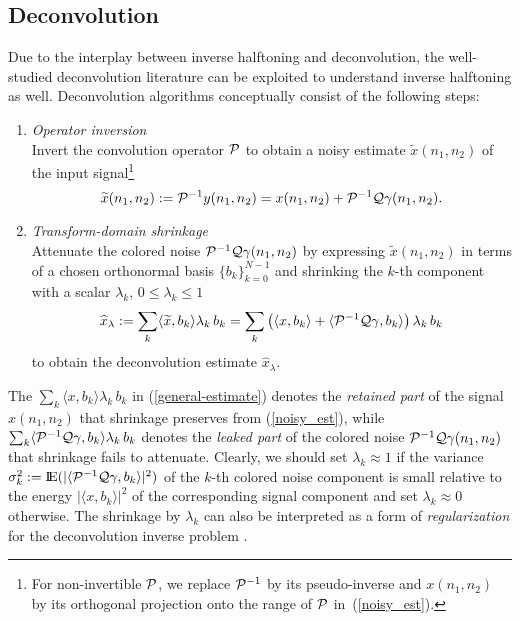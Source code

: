 \documentclass[11pt]{article}
\def\nnnx {n_1}
\def\nnny {n_2}
\def\NSQ{N}
\newcommand{\expect}{{\rm I \mkern-2.5mu \nonscript\mkern-.5mu E}}
\def\cP { {\cal{P}} }
\def\cQ { {\cal{Q}} }
\begin{document}
\subsection{Deconvolution}
\label{deconvolution}
\sloppy Due to the interplay between inverse halftoning and
deconvolution, the well-studied deconvolution literature
\cite{akjain,katman-book,Neelamani1} can be exploited to understand
inverse halftoning as well.  Deconvolution algorithms conceptually
consist of the following steps:
\begin{enumerate}
\item {\em Operator inversion}\\
Invert the convolution operator $\cP$ to obtain a noisy
estimate $\widetilde{x}(\nnnx,\nnny)$ of the input signal\footnote{For
non-invertible $\cP$, we replace $\cP^{-1}$ by its pseudo-inverse and
$x(\nnnx,\nnny)$ by its orthogonal projection onto the range of $\cP$
in~(\ref{noisy_est}).} 
\begin{equation}\widetilde{x}(\nnnx,\nnny) :=
\cP^{-1}y(\nnnx,\nnny) = x(\nnnx,\nnny) + \cP^{-1}\cQ\gamma(\nnnx,\nnny).
\label{noisy_est}
\end{equation}
\item {\em Transform-domain shrinkage}\\ 
Attenuate the colored noise
$\cP^{-1}\cQ\gamma(\nnnx,\nnny)$ by expressing $\widetilde{x}(\nnnx,\nnny)$ in
terms of a chosen  orthonormal basis
$\{b_k\}_{k=0}^{\NSQ -1}$  and shrinking the $k$-th component with a scalar
$\lambda_k$, $ 0\le \lambda_k \le 1$ \cite{james-stein}
\begin{equation} 
\widehat{x}_{\lambda} := \sum_k \langle \widetilde{x},b_k\rangle \lambda_k\, b_k = \sum_k \left(\langle x,b_k\rangle + \langle
\cP^{-1}\cQ\gamma,b_k\rangle\right) \lambda_k\, b_k 
\label{general-estimate}
\end{equation}
to obtain the deconvolution estimate $\widehat{x}_{\lambda}$.
\end{enumerate}

The $\sum_k \langle x,b_k\rangle \lambda_k\, b_k$ in
(\ref{general-estimate}) denotes the {\em retained part} of the signal
$x(\nnnx,\nnny)$ that shrinkage preserves from (\ref{noisy_est}),
while $\sum_k \langle \cP^{-1}\cQ\gamma,b_k\rangle \lambda_k\, b_k$
denotes the {\em leaked part} of the colored noise
$\cP^{-1}\cQ\gamma(\nnnx,\nnny)$ that shrinkage fails to attenuate.
Clearly, we should set $\lambda_k \approx 1$ if the variance
$\sigma_k^2 := \expect(|\langle \cP^{-1}\cQ\gamma,b_k\rangle|^2)$ of
the $k$-th colored noise component is small relative to the energy
$|\langle x,b_k\rangle|^2$ of the corresponding signal component and
set $\lambda_k \approx 0$ otherwise. The shrinkage by $\lambda_k$ can
also be interpreted as a form of {\em regularization} for the
deconvolution inverse problem \cite{katman-book}.
\end{document}
